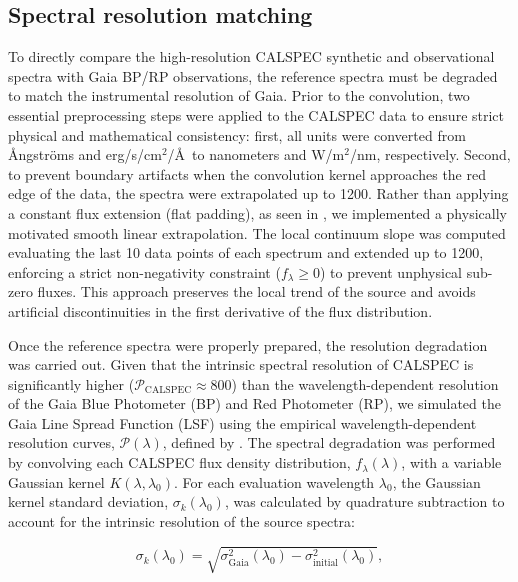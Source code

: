\documentclass{aa}
\begin{document}
\subsection{Spectral resolution matching}

To directly compare the high-resolution CALSPEC synthetic and observational spectra with Gaia BP/RP observations, the reference spectra must be degraded to match the instrumental resolution of Gaia. Prior to the convolution, two essential preprocessing steps were applied to the CALSPEC data to ensure strict physical and mathematical consistency: first, all units were converted from \AA ngstr\"oms and erg/s/cm$^2$/\AA\ to nanometers and W/m$^2$/nm, respectively. Second, to prevent boundary artifacts when the convolution kernel approaches the red edge of the data, the spectra were extrapolated up to 1200. Rather than applying a constant flux extension (flat padding), as seen in \citet{huang2024}, we implemented a physically motivated smooth linear extrapolation. The local continuum slope was computed evaluating the last 10 data points of each spectrum and extended up to 1200, enforcing a strict non-negativity constraint ($f_\lambda \ge 0$) to prevent unphysical sub-zero fluxes. This approach preserves the local trend of the source and avoids artificial discontinuities in the first derivative of the flux distribution.

Once the reference spectra were properly prepared, the resolution degradation was carried out. Given that the intrinsic spectral resolution of CALSPEC is significantly higher ($\mathcal{P}_{\text{CALSPEC}} \approx 800$) than the wavelength-dependent resolution of the Gaia Blue Photometer (BP) and Red Photometer (RP), we simulated the Gaia Line Spread Function (LSF) using the empirical wavelength-dependent resolution curves, $\mathcal{P}(\lambda)$, defined by \citet{montegriffo2023gaia}. The spectral degradation was performed by convolving each CALSPEC flux density distribution, $f_\lambda(\lambda)$, with a variable Gaussian kernel $K(\lambda, \lambda_0)$. For each evaluation wavelength $\lambda_0$, the Gaussian kernel standard deviation, $\sigma_k(\lambda_0)$, was calculated by quadrature subtraction to account for the intrinsic resolution of the source spectra:

\begin{equation}
\sigma_k(\lambda_0) = \sqrt{\sigma_{\text{Gaia}}^2(\lambda_0) - \sigma_{\text{initial}}^2(\lambda_0)},
\end{equation}
\end{document}
